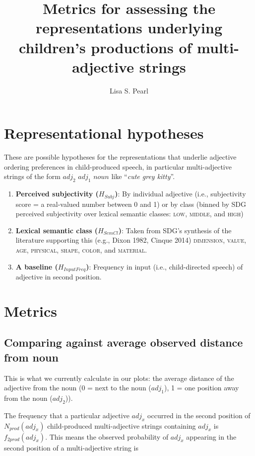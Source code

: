 \documentclass{article}
\title{Metrics for assessing the representations underlying children's productions of multi-adjective strings}
\author{Lisa S. Pearl}
\date{} %
\begin{document}
\maketitle

\section{Representational hypotheses}
\label{sec:hypotheses}
These are possible hypotheses for the representations that underlie adjective ordering preferences in child-produced speech, in particular 
 multi-adjective strings of the form $adj_2$ $adj_1$ $noun$ like ``\textit{cute grey kitty}''.

\begin{enumerate}
\item{\textbf{Perceived subjectivity ($H_{Subj}$)}: By individual adjective (i.e., subjectivity score = a real-valued number between 0 and 1) or by class (binned by SDG perceived subjectivity over lexical semantic classes: \textsc{low, middle,} and \textsc{high})
}

\item{\textbf{Lexical semantic class ($H_{SemCl}$)}: Taken from SDG's synthesis of the literature supporting this (e.g., Dixon 1982, Cinque 2014) \textsc{dimension, value, age, physical, shape, color,} and \textsc{material}.
}

\item{\textbf{A baseline ($H_{InputFreq}$)}: Frequency in input (i.e., child-directed speech) of adjective in second position.
}

\end{enumerate}



\section{Metrics}

\subsection{Comparing against average observed distance from noun}

This is what we currently calculate in our plots: the average distance of the adjective from the noun (0 = next to the noun ($adj_1$), 1 = one position away from the noun ($adj_2$)).

The frequency that a particular adjective $adj_x$ occurred in the second position of $N_{prod}(adj_x)$ child-produced multi-adjective strings containing $adj_x$ is $f_{2prod}(adj_x)$. This means the observed probability of $adj_x$ appearing in the second position of a multi-adjective string is
\end{document}

